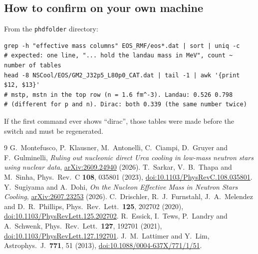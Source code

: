 \documentclass[11pt,a4paper]{article}
\newcommand{\doi}[1]{\href{https://doi.org/#1}{doi:#1}}
\newcommand{\arxiv}[1]{\href{https://arxiv.org/abs/#1}{arXiv:#1}}
\begin{document}
\subsection{How to confirm on your own machine}\label{sec:howto}
From the \texttt{phdfolder} directory:
\begin{verbatim}
grep -h "effective mass columns" EOS_RMF/eos*.dat | sort | uniq -c
# expected: one line, "... hold the landau mass in MeV", count ~ number of tables
head -8 NSCool/EOS/GM2_J32p5_L80p0_CAT.dat | tail -1 | awk '{print $12, $13}'
# mstp, mstn in the top row (n = 1.6 fm^-3). Landau: 0.526 0.798
# (different for p and n). Dirac: both 0.339 (the same number twice)
\end{verbatim}
If the first command ever shows ``dirac'', those tables were made before the switch and must be regenerated.

\begin{thebibliography}{9}
\small
{} G.~Montefusco, P.~Klausner, M.~Antonelli, C.~Ciampi, D.~Gruyer and F.~Gulminelli, \emph{Ruling out nucleonic direct Urca cooling in low-mass neutron stars using nuclear data}, \arxiv{2609.24940} (2026).
 T.~Sarkar, V.~B.~Thapa and M.~Sinha, Phys.\ Rev.\ C \textbf{108}, 035801 (2023), \doi{10.1103/PhysRevC.108.035801}.
 Y.~Sugiyama and A.~Dohi, \emph{On the Nucleon Effective Mass in Neutron Stars Cooling}, \arxiv{2607.23253} (2026).
 C.~Drischler, R.~J.~Furnstahl, J.~A.~Melendez and D.~R.~Phillips, Phys.\ Rev.\ Lett.\ \textbf{125}, 202702 (2020), \doi{10.1103/PhysRevLett.125.202702}.
 R.~Essick, I.~Tews, P.~Landry and A.~Schwenk, Phys.\ Rev.\ Lett.\ \textbf{127}, 192701 (2021), \doi{10.1103/PhysRevLett.127.192701}.
 J.~M.~Lattimer and Y.~Lim, Astrophys.\ J.\ \textbf{771}, 51 (2013), \doi{10.1088/0004-637X/771/1/51}.
\end{thebibliography}
\end{document}
